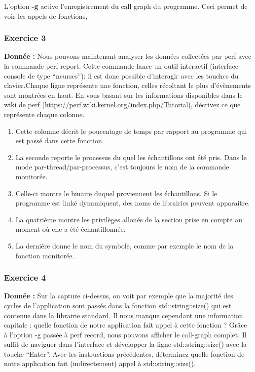L'option \textbf{-g} active l'enregistrement du call graph du programme. Ceci permet de voir les appels de fonctions, 

\subsubsection{Exercice 3}
\textbf{Donnée : } Nous	pouvons	maintenant	analyser	les	données	collectées	par	perf	avec	la	commande	perf	report.	
Cette	commande	lance	un	outil	interactif	(interface	console de	type	“ncurses”):	il	est	donc	possible	
d'interagir avec	les	touches	du	clavier.Chaque	ligne	représente	une	fonction,	celles	récoltant	le	plus	d'évènements	sont	montrées	en	haut.	
En	vous	basant sur	les	informations	disponibles	dans	le	wiki	de	perf	
(\url{https://perf.wiki.kernel.org/index.php/Tutorial}),	décrivez	ce	que	représente	chaque	colonne.\\

\begin{enumerate}
\item Cette colomne décrit le poucentage de temps par rapport au programme qui est passé dans cette fonction.
\item La seconde reporte le processus du quel les échantillons ont été pris. Dans le mode par-thread/par-processus, c'est toujours le nom de la commande monitorée. 
\item Celle-ci montre le binaire duquel proviennent les échantillons. Si le programme est linké dynamiquent, des noms de librairies peuvent apparaitre.  
\item La quatrième montre les privilèges alloués de la section prise en compte au moment où elle a été échantillonnée.
\item La dernière donne le nom du symbole, comme par exemple le nom de la fonction monitorée.
\end{enumerate}

\subsubsection{Exercice 4}
\textbf{Donnée : } Sur	la	capture	ci-dessus,	on	voit	par	exemple	que	la	majorité	des	cycles	de	l'application	sont	passés	
dans	la	fonction	std::string::size() qui	est	contenue	dans	la	librairie	standard.	Il	nous	manque	
cependant	une	information	capitale :	quelle	fonction	de	notre	application	fait	appel	à	cette	fonction	?	
Grâce	à	l'option	-g passée	à	perf	record,	nous	pouvons	afficher	le	call-graph	complet.	Il	suffit	de	
naviguer	dans	l'interface	et	développer	la	ligne	std::string::size() avec	la	touche	“Enter”.	
Avec	les	instructions	précédentes,	déterminez quelle	fonction	de	notre	application	fait	(indirectement)	
appel	à	std::string::size().\\


